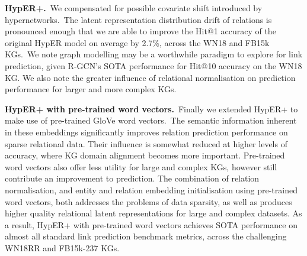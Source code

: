 \noindent \textbf{HypER+.}\ We compensated for possible covariate shift introduced by hypernetworks.\ The latent representation distribution drift of relations is pronounced enough that we are able to improve the Hit@1 accuracy of the original HypER model on average by 2.7\%, across the WN18 and FB15k KGs.\ We note graph modelling may be a worthwhile paradigm to explore for link prediction, given R-GCN's SOTA performance for Hit@10 accuracy on the WN18 KG. We also note the greater influence of relational normalisation on prediction performance for larger and more complex KGs. \par

\noindent \textbf{HypER+ with pre-trained word vectors.}\ Finally we extended HypER+ to make use of pre-trained GloVe word vectors.\ The semantic information inherent in these embeddings significantly improves relation prediction performance on sparse relational data. Their influence is somewhat reduced at higher levels of accuracy, where KG domain alignment becomes more important. Pre-trained word vectors also offer less utility for large and complex KGs, however still contribute an improvement to prediction. The combination of relation normalisation, and entity and relation embedding initialisation using pre-trained word vectors, both addresses the problems of data sparsity, as well as produces higher quality relational latent representations for large and complex datasets. As a result, HypER+ with pre-trained word vectors achieves SOTA performance on almost all standard link prediction benchmark metrics, across the challenging WN18RR and FB15k-237 KGs. 
